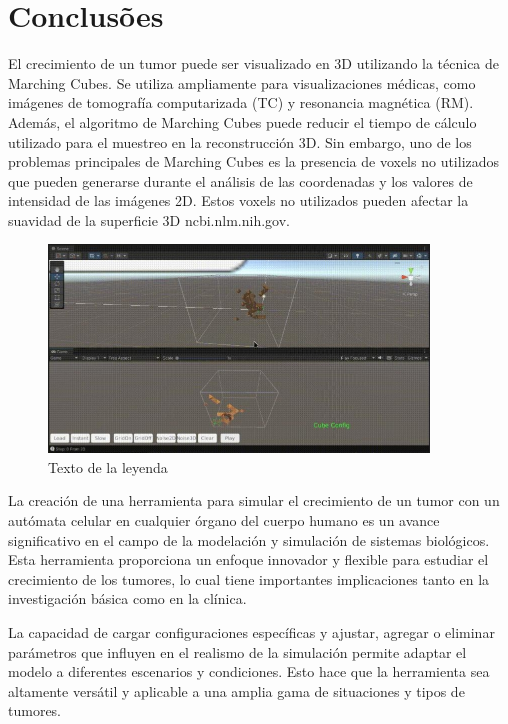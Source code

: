\documentclass[a4paper,11pt]{article}
\begin{document}
{\section*{Conclusões}

El crecimiento de un tumor puede ser visualizado en 3D utilizando la técnica de Marching Cubes. Se utiliza ampliamente para visualizaciones médicas, como imágenes de tomografía computarizada (TC) y resonancia magnética (RM). Además, el algoritmo de Marching Cubes puede reducir el tiempo de cálculo utilizado para el muestreo en la reconstrucción 3D. Sin embargo, uno de los problemas principales de Marching Cubes es la presencia de voxels no utilizados que pueden generarse durante el análisis de las coordenadas y los valores de intensidad de las imágenes 2D. Estos voxels no utilizados pueden afectar la suavidad de la superficie 3D ncbi.nlm.nih.gov.

\begin{figure}[h]
  \centering
  \includegraphics[width=0.9\textwidth]{tumor.jpg}
  \caption{Texto de la leyenda}
\end{figure}

La creación de una herramienta para simular el crecimiento de un tumor con un autómata celular en cualquier órgano del cuerpo humano es un avance significativo en el campo de la modelación y simulación de sistemas biológicos. Esta herramienta proporciona un enfoque innovador y flexible para estudiar el crecimiento de los tumores, lo cual tiene importantes implicaciones tanto en la investigación básica como en la clínica.

La capacidad de cargar configuraciones específicas y ajustar, agregar o eliminar parámetros que influyen en el realismo de la simulación permite adaptar el modelo a diferentes escenarios y condiciones. Esto hace que la herramienta sea altamente versátil y aplicable a una amplia gama de situaciones y tipos de tumores.

}
\end{document}
